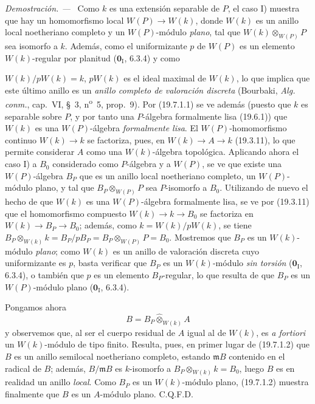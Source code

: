 \documentclass[10pt,oneside]{book}
\newcommand{\oldpage}[2][]{%
  \setcounter{footnote}{0}%
  \marginpar{\scriptsize\textbf{#1}~|~#2}\ignorespaces}
\newenvironment{proof}{%
  \par\medskip\noindent\textit{Demostración. ---\ }}{\par}
\begin{document}
\begin{proof}
Como $k$ es una extensión separable de $P$, el caso I) muestra que hay un
homomorfismo local $W(P)\to W(k)$, donde $W(k)$ es un anillo local noetheriano
completo y un $W(P)$-módulo \emph{plano}, tal que $W(k)\otimes_{W(P)}P$ sea isomorfo
a $k$. Además, como el uniformizante $p$ de $W(P)$ es un elemento
$W(k)$-regular por planitud ($\mathbf 0_{\mathrm I}$, 6.3.4) y como

\oldpage[0\textsubscript{IV-1}]{107}

$W(k)/pW(k)=k$, $pW(k)$ es el ideal maximal de $W(k)$, lo que implica que este
último anillo es un \emph{anillo completo de valoración discreta} (Bourbaki,
\emph{Alg. conm.}, cap.~VI, §~3, n\textsuperscript{o}~5, prop.~9). Por
(19.7.1.1) se ve además (puesto que $k$ es separable sobre $P$, y por tanto una
$P$-álgebra formalmente lisa (19.6.1)) que $W(k)$ es una $W(P)$-álgebra
\emph{formalmente lisa}. El $W(P)$-homomorfismo continuo $W(k)\to k$ se
factoriza, pues, en $W(k)\to A\to k$ (19.3.11), lo que permite considerar $A$
como una $W(k)$-álgebra topológica. Aplicando ahora el caso I) a $B_0$
considerado como $P$-álgebra y a $W(P)$, se ve que existe una
$W(P)$-álgebra $B_P$ que es un anillo local noetheriano completo, un
$W(P)$-módulo plano, y tal que $B_P\otimes_{W(P)}P$ sea $P$-isomorfo a
$B_0$. Utilizando de nuevo el hecho de que $W(k)$ es una $W(P)$-álgebra
formalmente lisa, se ve por (19.3.11) que el homomorfismo compuesto
$W(k)\to k\to B_0$ se factoriza en $W(k)\to B_P\to B_0$; además, como
$k=W(k)/pW(k)$, se tiene
$B_P\otimes_{W(k)}k=B_P/pB_P=B_P\otimes_{W(P)}P=B_0$. Mostremos que $B_P$ es
un $W(k)$-módulo \emph{plano}; como $W(k)$ es un anillo de valoración discreta
cuyo uniformizante es $p$, basta verificar que $B_P$ es un
$W(k)$-módulo \emph{sin torsión} ($\mathbf 0_{\mathrm I}$, 6.3.4), o también
que $p$ es un elemento $B_P$-regular, lo que resulta de que $B_P$ es un
$W(P)$-módulo plano ($\mathbf 0_{\mathrm I}$, 6.3.4).

Pongamos ahora
\[
  B=B_P\widehat\otimes_{W(k)}A
\]
y observemos que, al ser el cuerpo residual de $A$ igual al de $W(k)$, es
\emph{a fortiori} un $W(k)$-módulo de tipo finito. Resulta, pues, en primer lugar
de (19.7.1.2) que $B$ es un anillo semilocal noetheriano completo,
estando $\mathfrak mB$ contenido en el radical de $B$; además,
$B/\mathfrak mB$ es $k$-isomorfo a
$B_P\otimes_{W(k)}k=B_0$, luego $B$ es en realidad un anillo \emph{local}. Como $B_P$
es un $W(k)$-módulo plano, (19.7.1.2) muestra finalmente que $B$ es un $A$-módulo
plano. C.Q.F.D.
\end{proof}
\end{document}
